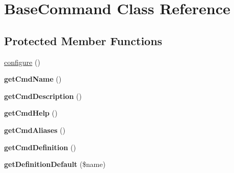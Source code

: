 \hypertarget{class_utopia_1_1_components_1_1_console_1_1_base_command}{
\section{BaseCommand Class Reference}
\label{class_utopia_1_1_components_1_1_console_1_1_base_command}
}
\subsection*{Protected Member Functions}
\begin{DoxyCompactItemize}
\item 
\hyperlink{class_utopia_1_1_components_1_1_console_1_1_base_command_a9be5e0bdb5720efed6ddb6426c5c16ee}{configure} ()
\item 
\hypertarget{class_utopia_1_1_components_1_1_console_1_1_base_command_a5badab6f355fb39953c34224dd0b3c50}{
{\bfseries getCmdName} ()}
\label{class_utopia_1_1_components_1_1_console_1_1_base_command_a5badab6f355fb39953c34224dd0b3c50}

\item 
\hypertarget{class_utopia_1_1_components_1_1_console_1_1_base_command_a7cd7e34c76d47bf32d63020c7eb5be54}{
{\bfseries getCmdDescription} ()}
\label{class_utopia_1_1_components_1_1_console_1_1_base_command_a7cd7e34c76d47bf32d63020c7eb5be54}

\item 
\hypertarget{class_utopia_1_1_components_1_1_console_1_1_base_command_a49d13c2efdcd9bc925130705807366a6}{
{\bfseries getCmdHelp} ()}
\label{class_utopia_1_1_components_1_1_console_1_1_base_command_a49d13c2efdcd9bc925130705807366a6}

\item 
\hypertarget{class_utopia_1_1_components_1_1_console_1_1_base_command_aee15392af12e202bf42ea30d9e280097}{
{\bfseries getCmdAliases} ()}
\label{class_utopia_1_1_components_1_1_console_1_1_base_command_aee15392af12e202bf42ea30d9e280097}

\item 
\hypertarget{class_utopia_1_1_components_1_1_console_1_1_base_command_ab18dfe4118823df6002d6b6e8571bd49}{
{\bfseries getCmdDefinition} ()}
\label{class_utopia_1_1_components_1_1_console_1_1_base_command_ab18dfe4118823df6002d6b6e8571bd49}

\item 
\hypertarget{class_utopia_1_1_components_1_1_console_1_1_base_command_a6bb8bc25d9590deadb315da58853c9d6}{
{\bfseries getDefinitionDefault} (\$name)}
\label{class_utopia_1_1_components_1_1_console_1_1_base_command_a6bb8bc25d9590deadb315da58853c9d6}

\end{DoxyCompactItemize}
